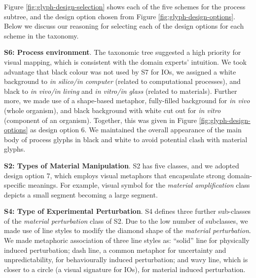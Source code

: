 Figure \ref{fig:glyph-design-selection} shows each of the five schemes for the process subtree, and the design option chosen from Figure \ref{fig:glyph-design-options}.
Below we discuss our reasoning for selecting each of the design options for each scheme in the taxonomy.


\textbf{S6: Process environment}.
The taxonomic tree suggested a high priority for visual mapping, which is consistent with the domain experts' intuition.
We took advantage that black colour was not used by S7 for IOs, we assigned a white background to \emph{in silico/in computer} (related to computational processes), and black to \emph{in vivo/in living} and \emph{in vitro/in glass} (related to materials).
Further more, we made use of a shape-based metaphor, fully-filled background for \emph{in vivo} (whole organism), and black background with white cut out for \emph{in vitro} (component of an organism).
Together, this was given in Figure \ref{fig:glyph-design-options} as design option 6.
We maintained the overall appearance of the main body of process glyphs in black and white to avoid potential clash with material glyphs.

\textbf{S2: Types of Material Manipulation}.
S2 has five classes, and we adopted design option 7, which employs visual metaphors that encapsulate strong domain-specific meanings.
For example, visual symbol for the \emph{material amplification} class depicts a small segment becoming a large segment.

\textbf{S4: Type of Experimental Perturbation}.
S4 defines three further sub-classes of the \emph{material perturbation} class of S2.
Due to the low number of subclasses, we made use of line styles to modify the diamond shape of the \emph{material perturbation}.
We made metaphoric association of three line styles as:
``solid'' line for physically induced perturbation;
dash line, a common metaphor for uncertainty and unpredictability, for behaviourally induced perturbation; and
wavy line, which is closer to a circle (a visual signature for IOs), for material induced perturbation.

